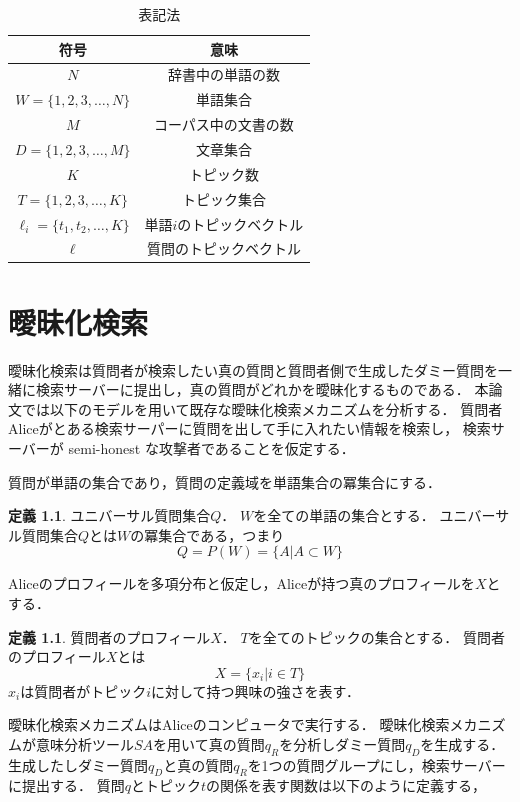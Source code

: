 \documentclass[master]{suribt}
\theoremstyle{definition}
\newtheorem{defi}[thm]{定義}
\begin{document}
 \begin{table}[!hbp]
 \center
 \begin{tabular}{|c|c|}
 \hline
 符号 & 意味 \\
 \hline
 $N$ & 辞書中の単語の数 \\
 $W = \{1,2,3, \dots ,N\} $ & 単語集合 \\
 $M$ & コーパス中の文書の数 \\
 $D = \{1,2,3, \dots ,M\}$ & 文章集合 \\
 $K$ & トピック数 \\
 $T = \{1,2,3, \dots ,K\}$ & トピック集合 \\
 $\ell_i = \{t_1,t_2,\dots,K\} $ & 単語$i$のトピックベクトル \\
 $\ell$ & 質問のトピックベクトル \\
 \hline
 \end{tabular}
 \caption{表記法}
 \end{table}

 \chapter{曖昧化検索} \label{s:OBS}
 曖昧化検索は質問者が検索したい真の質問と質問者側で生成したダミー質問を一緒に検索サーバーに提出し，真の質問がどれかを曖昧化するものである．
 本論文では以下のモデル\cite{}を用いて既存な曖昧化検索メカニズムを分析する．
 質問者Aliceがとある検索サーパーに質問を出して手に入れたい情報を検索し，
 検索サーバーが semi-honest な攻撃者であることを仮定する．
 
 質問が単語の集合であり，質問の定義域を単語集合の冪集合にする．
 
 \begin{defi}{ユニバーサル質問集合$Q$．}
  $W$を全ての単語の集合とする．
  ユニバーサル質問集合$Q$とは$W$の冪集合である，つまり
  \begin{equation}
  Q = P(W) = \{A|A \subset W\}
  \end{equation}
 \end{defi}
 Aliceのプロフィールを多項分布と仮定し，Aliceが持つ真のプロフィールを$X$とする．
 
 \begin{defi}{質問者のプロフィール$X$．}
  $T$を全てのトピックの集合とする．
  質問者のプロフィール$X$とは
  \begin{equation}
   X = \{x_i| i \in T\}
  \end{equation}
  $x_i$は質問者がトピック$i$に対して持つ興味の強さを表す．
 \end{defi}
 曖昧化検索メカニズムはAliceのコンピュータで実行する．
 曖昧化検索メカニズムが意味分析ツール$SA$を用いて真の質問$q_R$を分析しダミー質問$q_D$を生成する．
 生成したしダミー質問$q_D$と真の質問$q_R$を1つの質問グループにし，検索サーバーに提出する．
 質問$q$とトピック$t$の関係を表す関数は以下のように定義する，
 
\end{document}
